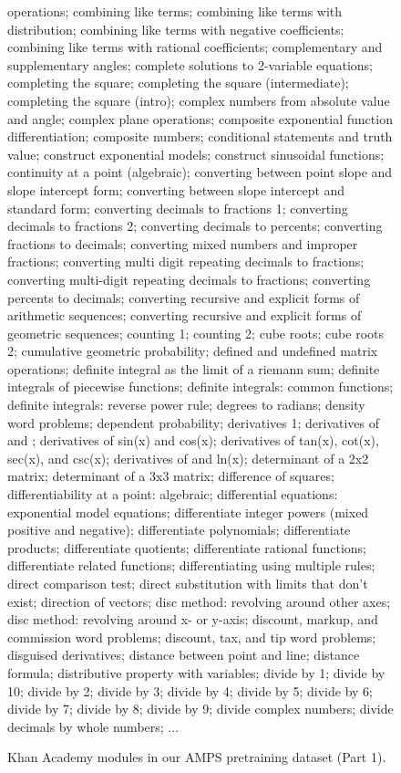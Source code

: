 \documentclass{article}
\begin{document}
\begin{figure*}
operations; combining like terms; combining like terms with distribution; combining like terms with negative coefficients; combining like terms with rational coefficients; complementary and supplementary angles; complete solutions to 2-variable equations; completing the square; completing the square (intermediate); completing the square (intro); complex numbers from absolute value and angle; complex plane operations; composite exponential function differentiation; composite numbers; conditional statements and truth value; construct exponential models; construct sinusoidal functions; continuity at a point (algebraic); converting between point slope and slope intercept form; converting between slope intercept and standard form; converting decimals to fractions 1; converting decimals to fractions 2; converting decimals to percents; converting fractions to decimals; converting mixed numbers and improper fractions; converting multi digit repeating decimals to fractions; converting multi-digit repeating decimals to fractions; converting percents to decimals; converting recursive and explicit forms of arithmetic sequences; converting recursive and explicit forms of geometric sequences; counting 1; counting 2; cube roots; cube roots 2; cumulative geometric probability; defined and undefined matrix operations; definite integral as the limit of a riemann sum; definite integrals of piecewise functions; definite integrals: common functions; definite integrals: reverse power rule; degrees to radians; density word problems; dependent probability; derivatives 1; derivatives of  and ; derivatives of sin(x) and cos(x); derivatives of tan(x), cot(x), sec(x), and csc(x); derivatives of  and ln(x); determinant of a 2x2 matrix; determinant of a 3x3 matrix; difference of squares; differentiability at a point: algebraic; differential equations: exponential model equations; differentiate integer powers (mixed positive and negative); differentiate polynomials; differentiate products; differentiate quotients; differentiate rational functions; differentiate related functions; differentiating using multiple rules; direct comparison test; direct substitution with limits that don't exist; direction of vectors; disc method: revolving around other axes; disc method: revolving around x- or y-axis; discount, markup, and commission word problems; discount, tax, and tip word problems; disguised derivatives; distance between point and line; distance formula; distributive property with variables; divide by 1; divide by 10; divide by 2; divide by 3; divide by 4; divide by 5; divide by 6; divide by 7; divide by 8; divide by 9; divide complex numbers; divide decimals by whole numbers; ...
\caption{Khan Academy modules in our AMPS pretraining dataset (Part 1).}
\label{fig:khan}
\end{figure*}
\end{document}
